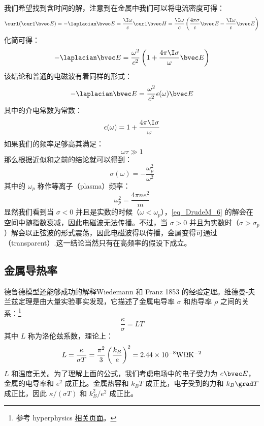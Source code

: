我们希望找到含时间的解，注意到在金属中我们可以将电流密度可得：
\begin{equation}
\curl(\curl\bvec E)=-\laplacian \bvec E =\frac{\I\omega}{c}\curl\bvec H=\frac{\I\omega}{c}\left(\frac{4\pi\sigma}{c}\bvec E-\frac{\I\omega}{c}\bvec E\right)
\end{equation}
化简可得：
\begin{equation}
-\laplacian \bvec E =\frac{\omega^2}{c^2}\left(1+\frac{4\pi\I\sigma}{\omega}\bvec E\right)
\end{equation}
该结论和普通的电磁波有着同样的形式：
\begin{equation}\label{eq_DrudeM_6}
-\laplacian \bvec E = \frac{\omega^2}{c^2}\epsilon(\omega)\bvec E
\end{equation}
其中的介电常数为常数：
\begin{equation}
\epsilon(\omega)=1+\frac{4\pi\I\sigma}{\omega}
\end{equation}
如果我们的频率足够高其满足：
\begin{equation}
\omega\tau\gg 1
\end{equation}
那么根据近似和之前的结论就可以得到：
\begin{equation}
\sigma(\omega)=-\frac{\omega_p^2}{\omega^2}
\end{equation}
其中的 $\omega_p$ 称作等离子（plasma）频率：
\begin{equation}
\omega_p^2=\frac{4\pi ne^2}{m}
\end{equation}
显然我们看到当 $\sigma<0$ 并且是实数的时候（$\omega<\omega_p$），\autoref{eq_DrudeM_6} 的解会在空间中随指数衰减，因此电磁波无法传播。不过，当 $\sigma>0$ 并且为实数时（$\sigma>\sigma_p$）解会以正弦波的形式震荡，因此电磁波得以传播，金属变得可通过（transparent）.这一结论当然只有在高频率的假设下成立。

\subsection{金属导热率}
德鲁德模型还能够成功的解释Wiedemann 和 Franz 1853 的经验定理。维德曼-夫兰兹定理是由大量实验事实发现，它描述了金属电导率 $\sigma$ 和热导率 $\rho$ 之间的关系：\footnote{参考 hyperphysics \href{http://hyperphysics.phy-astr.gsu.edu/hbase/thermo/thercond.html}{相关页面}。}
\begin{equation}
\frac{\kappa}{\sigma}=LT
\end{equation}
其中 $L$ 称为洛伦兹系数，理论上：
\begin{equation}\label{eq_DrudeM_47}
L=\frac{\kappa}{\sigma T}=\frac{\pi^2}{3}\left(\frac{k_B}{e}\right)^2 = 2.44\times10^{-8}\rm{W\Omega K^{-2}}
\end{equation}
$L$ 和温度无关。为了理解上面的公式，我们考虑电场中的电子受力为 $e\bvec E$，金属的电导率和 $e^2$ 成正比。金属热容和 $k_B T$ 成正比，电子受到的力和 $k_B\grad T$ 成正比，因此 $\kappa/(\sigma T)$ 和 $k_B^2/e^2$ 成正比。

